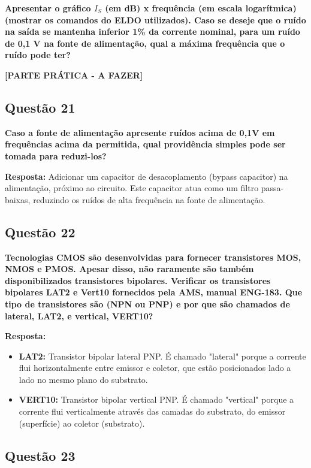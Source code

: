 \documentclass[12pt,a4paper]{article}
\begin{document}
\textbf{Apresentar o gráfico $I_S$ (em dB) x frequência (em escala logarítmica)(mostrar os comandos do ELDO utilizados). Caso se deseje que o ruído na saída se mantenha inferior 1\% da corrente nominal, para um ruído de 0,1 V na fonte de alimentação, qual a máxima frequência que o ruído pode ter?}

\textbf{[PARTE PRÁTICA - A FAZER]}

\subsection*{Questão 21}

\textbf{Caso a fonte de alimentação apresente ruídos acima de 0,1V em frequências acima da permitida, qual providência simples pode ser tomada para reduzi-los?}

\textbf{Resposta:} Adicionar um capacitor de desacoplamento (bypass capacitor) na alimentação, próximo ao circuito. Este capacitor atua como um filtro passa-baixas, reduzindo os ruídos de alta frequência na fonte de alimentação.

\subsection*{Questão 22}

\textbf{Tecnologias CMOS são desenvolvidas para fornecer transistores MOS, NMOS e PMOS. Apesar disso, não raramente são também disponibilizados transistores bipolares. Verificar os transistores bipolares LAT2 e Vert10 fornecidos pela AMS, manual ENG-183. Que tipo de transistores são (NPN ou PNP) e por que são chamados de lateral, LAT2, e vertical, VERT10?}

\textbf{Resposta:} 
\begin{itemize}
    \item \textbf{LAT2:} Transistor bipolar lateral PNP. É chamado "lateral" porque a corrente flui horizontalmente entre emissor e coletor, que estão posicionados lado a lado no mesmo plano do substrato.
    \item \textbf{VERT10:} Transistor bipolar vertical PNP. É chamado "vertical" porque a corrente flui verticalmente através das camadas do substrato, do emissor (superfície) ao coletor (substrato).
\end{itemize}

\subsection*{Questão 23}
\end{document}
